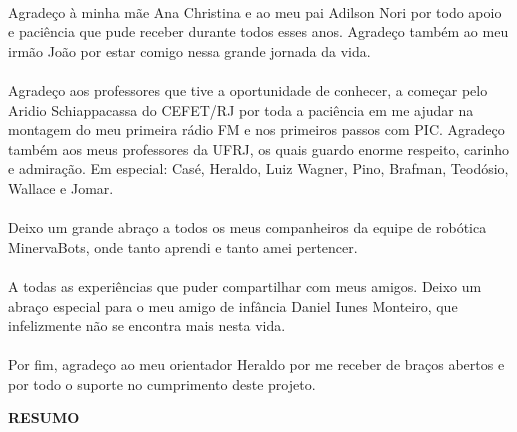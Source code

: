 \paragraph{} Agradeço à minha mãe Ana Christina e ao meu pai Adilson Nori por todo apoio e paciência que pude receber durante todos esses anos. Agradeço também ao meu irmão João por estar comigo nessa grande jornada da vida.

\paragraph{} Agradeço aos professores que tive a oportunidade de conhecer, a começar pelo Aridio Schiappacassa do CEFET/RJ por toda a paciência em me ajudar na montagem do meu primeira rádio FM e nos primeiros passos com PIC. Agradeço também aos meus professores da UFRJ, os quais guardo enorme respeito, carinho e admiração. Em especial: Casé, Heraldo, Luiz Wagner, Pino, Brafman, Teodósio, Wallace e Jomar.

\paragraph{} Deixo um grande abraço a todos os meus companheiros da equipe de robótica MinervaBots, onde tanto aprendi e tanto amei pertencer.

\paragraph{} A todas as experiências que puder compartilhar com meus amigos. Deixo um abraço especial para o meu amigo de infância Daniel Iunes Monteiro,  que infelizmente não se encontra mais nesta vida.

\paragraph{} Por fim, agradeço ao meu orientador Heraldo por me receber de braços abertos e por todo o suporte no cumprimento deste projeto.

\pagebreak


\begin{center}
\textbf{RESUMO}
\end{center}
      \vspace{0.5cm}

